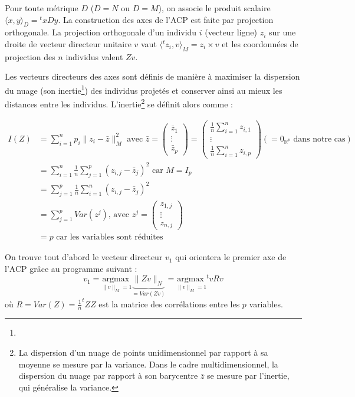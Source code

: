 \documentclass[11pt,french,french]{article}
\let\rmarkdownfootnote\footnote%
\def\footnote{\protect\rmarkdownfootnote}
\begin{document}
Pour toute métrique \(D\) (\(D=N\) ou \(D=M\)), on associe le produit
scalaire \(\langle x,y\rangle_{D} = {}^t\!xD y\). La construction des
axes de l'ACP est faite par projection orthogonale. La projection
orthogonale d'un individu \(i\) (vecteur ligne) \(z_i\) sur une droite
de vecteur directeur unitaire \(v\) vaut
\(\langle {}^tz_i,v\rangle_{M}=z_i\times v\) et les coordonnées de
projection des \(n\) individus valent \(Zv\).

Les vecteurs directeurs des axes sont définis de manière à maximiser la
dispersion du nuage (son inertie\footnote{}) des individus projetés et
conserver ainsi au mieux les distances entre les individus.
L'inertie\footnote{La dispersion d'un nuage de points unidimensionnel
  par rapport à sa moyenne se mesure par la variance. Dans le cadre
  multidimensionnel, la dispersion du nuage par rapport à son barycentre
  \(\bar z\) se mesure par l'inertie, qui généralise la variance.} se
définit alors comme :

\begin{align*}
I(Z) &= \sum_{i = 1}^n p_i\|z_i-\bar{z}\|_M^2 \text{ avec }
  \bar{z} = 
  \begin{pmatrix}\bar z_{1} \\
    \vdots \\ \bar z_{p}
  \end{pmatrix} =
  \begin{pmatrix}\frac 1 n \sum_{i=1}^n z_{i,1} \\
    \vdots \\ \frac 1 n \sum_{i=1}^n z_{i,p}
  \end{pmatrix} (= 0_{\mathbb R^p}\text{ dans notre cas})
\\&=\sum_{i = 1}^n \frac 1 n \sum_{j=1}^p (z_{i,j} -  \bar{z}_j)^2  \text{ car }M=I_p 
\\&=\sum_{j = 1}^p \frac 1 n \sum_{i=1}^n (z_{i,j} -  \bar{z}_j)^2
\\&=\sum_{j = 1}^p Var(z^j)\text{, avec } z^j = 
  \begin{pmatrix} z_{1,j} \\ \vdots \\  z_{n,j} 
  \end{pmatrix}
\\ &= p \text{ car les variables sont réduites}
\end{align*}

On trouve tout d'abord le vecteur directeur \(v_1\) qui orientera le
premier axe de l'ACP grâce au programme suivant : \[
v_1 =\underset{\| v \|_M = 1}{\mathrm{argmax~}} 
\underbrace{\|Zv\|_N}_{=Var(Zv)} =\underset{\| v \|_M = 1}{\mathrm{argmax~}} ^t\!vR v 
\] où \(R = Var(Z) = \frac{1}{n} ^t\!Z Z\) est la matrice des
corrélations entre les \(p\) variables.
\end{document}

